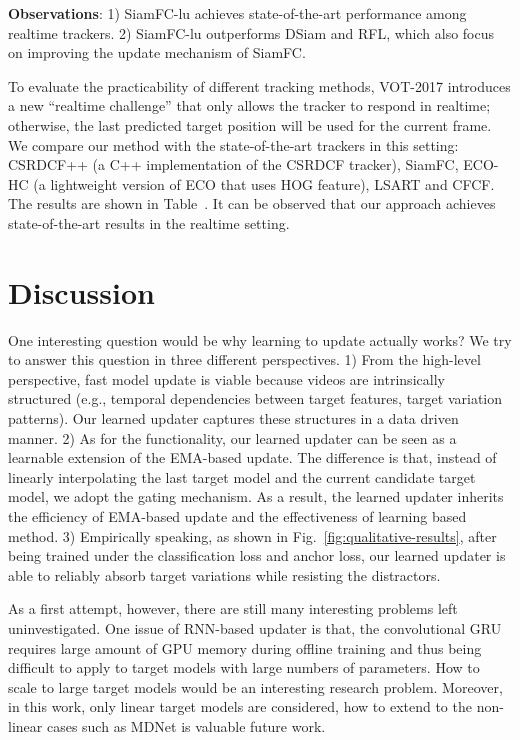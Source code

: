 \documentclass[journal]{IEEEtran}
\begin{document}
\textbf{Observations}: 1) SiamFC-lu achieves state-of-the-art performance among realtime trackers. 2) SiamFC-lu outperforms DSiam and RFL, which also focus on improving the update mechanism of SiamFC.

To evaluate the practicability of different tracking methods, VOT-2017 introduces a new ``realtime challenge'' that only allows the tracker to respond in realtime; otherwise, the last predicted target position will be used for the current frame. We compare our method with the state-of-the-art trackers in this setting: CSRDCF++ (a C++ implementation of the CSRDCF\cite{lukezic2017discriminative} tracker), SiamFC\cite{bertinetto2016fully}, ECO-HC (a lightweight version of ECO\cite{Danelljan2016ECOEC} that uses HOG feature), LSART\cite{sun2018learning} and CFCF\cite{gundogdu2018good}. The results are shown in Table~. It can be observed that our approach achieves state-of-the-art results in the realtime setting.

\section{Discussion}
One interesting question would be why learning to update actually works? We try to answer this question in three different perspectives. 1) From the high-level perspective, fast model update is viable because videos are intrinsically structured (e.g., temporal dependencies between target features, target variation patterns). Our learned updater captures these structures in a data driven manner. 2) As for the functionality, our learned updater can be seen as a learnable extension of the EMA-based update. The difference is that, instead of linearly interpolating the last target model and the current candidate target model, we adopt the gating mechanism.  As a result, the learned updater inherits the efficiency of EMA-based update and the effectiveness of learning based method. 3) Empirically speaking, as shown in Fig.~\ref{fig:qualitative-results}, after being trained under the classification loss and anchor loss, our learned updater is able to reliably absorb target variations while resisting the distractors. 

As a first attempt, however, there are still many interesting problems left uninvestigated. One issue of RNN-based updater is that, the convolutional GRU requires large amount of GPU memory during offline training and thus being difficult to apply to target models with large numbers of parameters. How to scale to large target models would be an interesting research problem. Moreover, in this work, only linear target models are considered, how to extend to the non-linear cases such as MDNet is valuable future work. 
\end{document}
